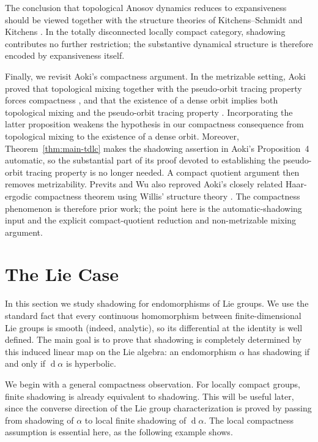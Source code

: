 \documentclass[12pt]{amsart}
\theoremstyle{definition}
\numberwithin{equation}{section}
\theoremstyle{remark}
\DeclareMathOperator{\di}{d}
\begin{document}
The conclusion that topological Anosov dynamics reduces to
expansiveness should be viewed together with the structure theories of
Kitchens--Schmidt \cite{KS1989} and Kitchens \cite{Kitchens2021}. In the totally disconnected
locally compact category, shadowing contributes no further restriction;
the substantive dynamical structure is therefore encoded by
expansiveness itself.

Finally, we revisit Aoki's compactness argument. In the metrizable
setting, Aoki proved that topological mixing together with the pseudo-orbit
tracing property forces compactness
\cite[Proposition~3]{AokiDense1985}, and
that the existence of a dense orbit implies both topological mixing and the
pseudo-orbit tracing property \cite[Proposition~4]{AokiDense1985}.
Incorporating
the latter proposition weakens the hypothesis in our compactness
consequence from topological mixing to the existence of a dense orbit.
Moreover, Theorem~\ref{thm:main-tdlc} makes the shadowing assertion in Aoki's
Proposition~4 automatic, so the substantial part of its proof devoted to
establishing the pseudo-orbit tracing property is no longer needed. A
compact quotient argument then removes metrizability. Previts and Wu also
reproved Aoki's closely related Haar-ergodic compactness theorem using
Willis' structure theory \cite{PrevitsWu2003}. The compactness phenomenon is
therefore prior work; the point here is the automatic-shadowing input and
the explicit compact-quotient reduction and non-metrizable mixing argument.




\section{The Lie Case}\label{Lie}


In this section we study shadowing for endomorphisms of Lie groups. We use
the standard fact that every continuous homomorphism between
finite-dimensional Lie groups is smooth (indeed, analytic), so its
differential at the identity is well defined. The main goal is to prove
that shadowing is completely determined by this induced linear map on the
Lie algebra: an endomorphism $\alpha$ has shadowing if and only if
$\di\alpha$ is hyperbolic.

We begin with a general compactness observation. For locally compact
groups, finite shadowing is already equivalent to shadowing. This will be
useful later, since the converse direction of the Lie group characterization
is proved by passing from shadowing of $\alpha$ to local finite shadowing of
$\di\alpha$. The local compactness assumption is essential here, as the
following example shows.
\end{document}
